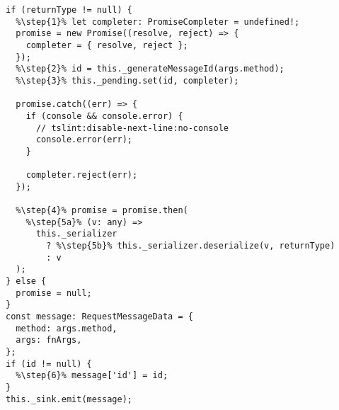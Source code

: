 \begin{verbatim}
if (returnType != null) {
  %\step{1}% let completer: PromiseCompleter = undefined!;
  promise = new Promise((resolve, reject) => {
    completer = { resolve, reject };
  });
  %\step{2}% id = this._generateMessageId(args.method);
  %\step{3}% this._pending.set(id, completer);

  promise.catch((err) => {
    if (console && console.error) {
      // tslint:disable-next-line:no-console
      console.error(err);
    }

    completer.reject(err);
  });

  %\step{4}% promise = promise.then(
    %\step{5a}% (v: any) =>
      this._serializer
        ? %\step{5b}% this._serializer.deserialize(v, returnType)
        : v
  );
} else {
  promise = null;
}
const message: RequestMessageData = {
  method: args.method,
  args: fnArgs,
};
if (id != null) {
  %\step{6}% message['id'] = id;
}
this._sink.emit(message);
\end{verbatim}
